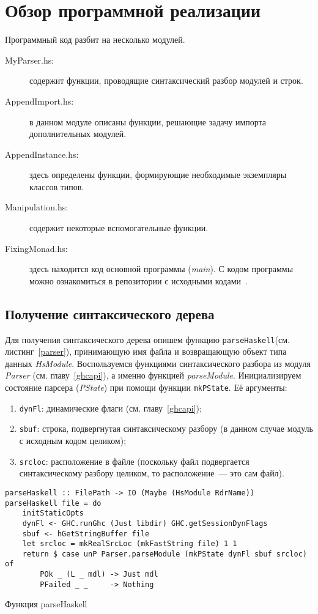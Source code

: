 \chapter{Обзор программной реализации}
Программный код разбит на несколько модулей.
\begin{description}
    \item[MyParser.hs:] содержит функции, проводящие синтаксический разбор модулей и строк.
    \item[AppendImport.hs:] в данном модуле описаны функции, решающие задачу импорта дополнительных модулей.
    \item[AppendInstance.hs:] здесь определены функции, формирующие необходимые экземпляры классов типов.
    \item[Manipulation.hs:] содержит некоторые вспомогательные функции.
    \item[FixingMonad.hs:] здесь находится код основной программы (\textit{main}).
    С кодом программы можно ознакомиться в репозитории с исходными кодами~\autocite{github}.
\end{description}
\section{Получение синтаксического дерева}
Для получения синтаксического дерева опишем функцию \lstinline{parseHaskell}(см. листинг~\ref{parser}), принимающую имя файла и возвращающую объект типа данных \textit{HsModule}. Воспользуемся функциями синтаксического разбора из модуля \textit{Parser} (см. главу~\ref{ghcapi}), а именно функцией \textit{parseModule}. Инициализируем состояние парсера (\textit{PState}) при помощи функции \lstinline{mkPState}. Её аргументы:
\begin{enumerate}[1)]
\item \lstinline{dynFl}: динамические флаги (см. главу~\ref{ghcapi});
\item \lstinline{sbuf}: строка, подвергнутая синтаксическому разбору (в данном случае модуль с исходным кодом целиком);
\item \lstinline{srcloc}: расположение в файле (поскольку файл подвергается синтаксическому разбору целиком, то расположение~--- это сам файл).
\end{enumerate}

\begin{ListingEnv}[H]
\begin{lstlisting}
parseHaskell :: FilePath -> IO (Maybe (HsModule RdrName))
parseHaskell file = do
    initStaticOpts
    dynFl <- GHC.runGhc (Just libdir) GHC.getSessionDynFlags
    sbuf <- hGetStringBuffer file
    let srcloc = mkRealSrcLoc (mkFastString file) 1 1
    return $ case unP Parser.parseModule (mkPState dynFl sbuf srcloc) of
        POk _ (L _ mdl) -> Just mdl
        PFailed _ _     -> Nothing
\end{lstlisting}
\caption{Функция parseHaskell}\label{parser}
\end{ListingEnv}
